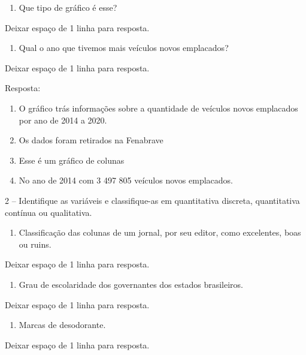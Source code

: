 \begin{enumerate}
\def\labelenumi{\alph{enumi})}
\item
  Que tipo de gráfico é esse?
\end{enumerate}

Deixar espaço de 1 linha para resposta.

\begin{enumerate}
\def\labelenumi{\alph{enumi})}
\item
  Qual o ano que tivemos mais veículos novos emplacados?
\end{enumerate}

Deixar espaço de 1 linha para resposta.

Resposta:

\begin{enumerate}
\def\labelenumi{\alph{enumi})}
\item
  O gráfico trás informações sobre a quantidade de veículos novos
  emplacados por ano de 2014 a 2020.
\item
  Os dados foram retirados na Fenabrave
\item
  Esse é um gráfico de colunas
\item
  No ano de 2014 com 3 497 805 veículos novos emplacados.
\end{enumerate}

2 -- Identifique as variáveis e classifique-as em quantitativa discreta,
quantitativa contínua ou qualitativa.

\begin{enumerate}
\def\labelenumi{\alph{enumi})}
\item
  Classificação das colunas de um jornal, por seu editor, como
  excelentes, boas ou ruins.
\end{enumerate}

Deixar espaço de 1 linha para resposta.

\begin{enumerate}
\def\labelenumi{\alph{enumi})}
\item
  Grau de escolaridade dos governantes dos estados brasileiros.
\end{enumerate}

Deixar espaço de 1 linha para resposta.

\begin{enumerate}
\def\labelenumi{\alph{enumi})}
\item
  Marcas de desodorante.
\end{enumerate}

Deixar espaço de 1 linha para resposta.

